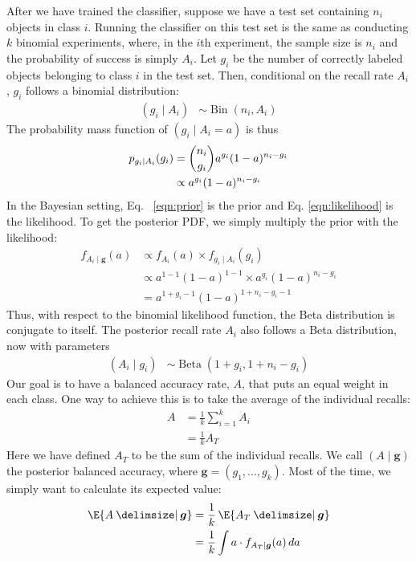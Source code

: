 \documentclass[fleqn,10pt,lineno]{wlpeerj} %
\DeclareMathOperator{\Beta}{Beta}
\DeclareMathOperator{\Bin}{Bin}
\providecommand\given{}
\renewcommand\given{  \nonscript\:
		\delimsize\vert
		\nonscript\:
		\mathopen{}
		\allowbreak}
\renewcommand\given{  \nonscript\:
		\delimsize\vert
		\nonscript\:
		\mathopen{}
		\allowbreak}
\begin{document}
After we have trained the classifier, suppose we have a test set containing
$n_i$ objects in class $i$. Running the classifier on this test set is the same
as conducting $k$ binomial experiments, where, in the $i$th experiment, the
sample size is $n_i$ and the probability of success is simply $A_i$. Let $g_i$
be the number of correctly labeled objects belonging to class $i$ in the test
set. Then, conditional on the recall rate $A_i$, $g_i$ follows a binomial
distribution:
	\begin{align}
		(g_i \mid A_i) &\sim \Bin(n_i, A_i)
	\end{align}
The probability mass function of $(g_i \mid A_i = a)$ is thus
    \begin{align}
		p_{g_i \mid A_i}(g_i) &= \binom{n_i}{g_i} a^{g_i} (1 - a)^{n_i - g_i}
						  							\label{eqn:likelihood} \\
                              &\propto a^{g_i} (1 - a)^{n_i - g_i} \notag
    \end{align}
In the Bayesian  setting, Eq. ~\eqref{eqn:prior} is the prior
and Eq. \eqref{eqn:likelihood} is the likelihood. To get the posterior PDF, we
simply multiply the prior with the likelihood:
	\begin{align}
		f_{A_i \mid \bm{g}}(a)
		&\propto f_{A_i}(a) \times f_{g_i \mid A_i}(g_i) \\
		&\propto a^{1-1}(1-a)^{1-1} \times a^{g_i} (1 - a)^{n_i - g_i} \\
		&= a^{1 + g_i - 1}(1-a)^{1 + n_i - g_i - 1}
	\end{align}
Thus, with respect to the binomial likelihood function, the Beta distribution
is conjugate to itself. The posterior recall rate $A_i$ also follows a Beta
distribution, now with parameters
	\begin{align}
		(A_i \mid g_i) &\sim \Beta(1 + g_i, 1 + n_i - g_i)
	\end{align}
Our goal is to have a balanced accuracy rate, $A$, that puts an equal weight in
each class. One way to achieve this is to take the average of the individual
recalls:
	\begin{align}
		A &= \frac{1}{k} \sum_{i=1}^k A_i \\
		&= \frac{1}{k} A_T
	\end{align}
Here we have defined $A_T$ to be the sum of the individual recalls. We call $(A
\mid \bm{g})$ the posterior balanced accuracy, where $\bm{g} =(g_1,...,g_k)$.
Most of the time, we simply want to calculate its expected value:
	\begin{align}
		\E{A \given \bm{g}} &= \frac{1}{k} \, \E{A_T \given \bm{g}} \\
		&= \frac{1}{k} \int a \cdot f_{A_T \mid \bm{g}}(a) \, da
	\end{align}
\end{document}
